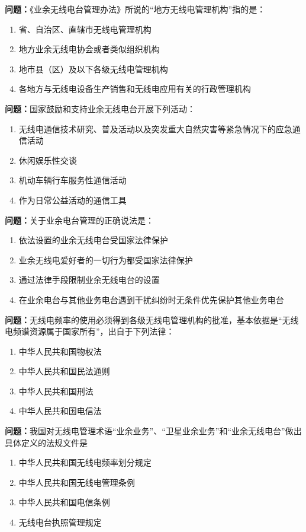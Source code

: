 \documentclass{ctexbook}
\begin{document}
\textbf{问题：}《业余无线电台管理办法》所说的“地方无线电管理机构”指的是：
\begin{enumerate}[label=\Alph*), leftmargin=3em]
\item 省、自治区、直辖市无线电管理机构
\item 地方业余无线电协会或者类似组织机构
\item 地市县（区）及以下各级无线电管理机构
\item 各地方与无线电设备生产销售和无线电应用有关的行政管理机构
\end{enumerate}

\textbf{问题：}国家鼓励和支持业余无线电台开展下列活动：
\begin{enumerate}[label=\Alph*), leftmargin=3em]
\item 无线电通信技术研究、普及活动以及突发重大自然灾害等紧急情况下的应急通信活动
\item 休闲娱乐性交谈
\item 机动车辆行车服务性通信活动
\item 作为日常公益活动的通信工具
\end{enumerate}

\textbf{问题：}关于业余电台管理的正确说法是：
\begin{enumerate}[label=\Alph*), leftmargin=3em]
\item 依法设置的业余无线电台受国家法律保护
\item 业余无线电爱好者的一切行为都受国家法律保护
\item 通过法律手段限制业余无线电台的设置
\item 在业余电台与其他业务电台遇到干扰纠纷时无条件优先保护其他业务电台
\end{enumerate}

\textbf{问题：}无线电频率的使用必须得到各级无线电管理机构的批准，基本依据是“无线电频谱资源属于国家所有”，出自于下列法律：
\begin{enumerate}[label=\Alph*), leftmargin=3em]
\item 中华人民共和国物权法
\item 中华人民共和国民法通则
\item 中华人民共和国刑法
\item 中华人民共和国电信法
\end{enumerate}

\textbf{问题：}我国对无线电管理术语“业余业务”、“卫星业余业务”和“业余无线电台”做出具体定义的法规文件是
\begin{enumerate}[label=\Alph*), leftmargin=3em]
\item 中华人民共和国无线电频率划分规定
\item 中华人民共和国无线电管理条例
\item 中华人民共和国电信条例
\item 无线电台执照管理规定
\end{enumerate}
\end{document}
